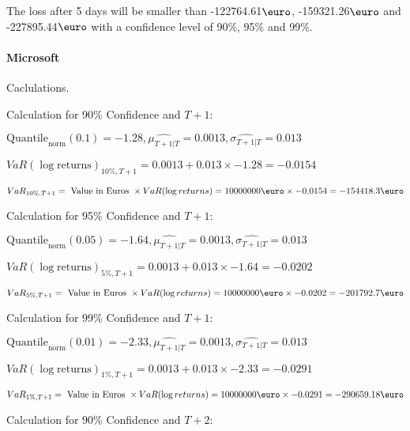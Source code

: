 The loss after 5 days will be smaller than -122764.61$\text{\euro}$, -159321.26$\text{\euro}$  and -227895.44$\text{\euro}$  with a confidence level of 90\%, 95\%  and 99\%.


\paragraph{Microsoft} Caclulations.\newline \indent 




Calculation for 90\% Confidence and $T+1$:

\indent\indent $\text{Quantile}_\text{norm}(0.1) = -1.28,\hat{\mu_{T+1|T}} = 0.0013, \hat{\sigma_{T+1|T}} = 0.013$

\indent\indent $VaR(\log \text{returns})_{10\%, T + 1} = 0.0013 + 0.013\times-1.28 = -0.0154$

\indent\indent $VaR_{10\%, T + 1} = \text{ Value in Euros } \times VaR(\log returns) = 10 000 000 \text{\euro} \times-0.0154 = -154418.3 \text{\euro}$\newline




Calculation for 95\% Confidence and $T+1$:

\indent\indent $\text{Quantile}_\text{norm}(0.05) = -1.64,\hat{\mu_{T+1|T}} = 0.0013, \hat{\sigma_{T+1|T}} = 0.013$

\indent\indent $VaR(\log \text{returns})_{5\%, T + 1} = 0.0013 + 0.013\times-1.64 = -0.0202$

\indent\indent $VaR_{5\%, T + 1} = \text{ Value in Euros } \times VaR(\log returns) = 10 000 000 \text{\euro} \times-0.0202 = -201792.7 \text{\euro}$\newline




Calculation for 99\% Confidence and $T+1$:

\indent\indent $\text{Quantile}_\text{norm}(0.01) = -2.33,\hat{\mu_{T+1|T}} = 0.0013, \hat{\sigma_{T+1|T}} = 0.013$

\indent\indent $VaR(\log \text{returns})_{1\%, T + 1} = 0.0013 + 0.013\times-2.33 = -0.0291$

\indent\indent $VaR_{1\%, T + 1} = \text{ Value in Euros } \times VaR(\log returns) = 10 000 000 \text{\euro} \times-0.0291 = -290659.18 \text{\euro}$\newline




Calculation for 90\% Confidence and $T+2$:

